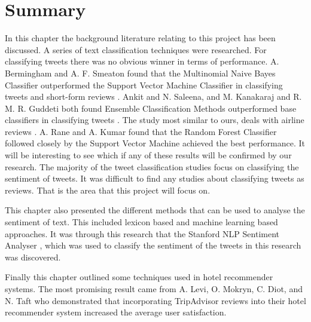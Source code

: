 
\section{Summary}


In this chapter the background literature relating to this project has been discussed. A series of text classification techniques were researched. For classifying tweets there was no obvious winner in terms of performance. A. Bermingham and A. F. Smeaton found that the Multinomial Naive Bayes Classifier outperformed the Support Vector Machine Classifier in classifying tweets and short-form reviews \cite{Berm2010}. Ankit and N. Saleena, and M. Kanakaraj and R. M. R. Guddeti both found Ensemble Classification Methods outperformed base classifiers in classifying tweets \cite{Ankit2018,Kanakaraj2015}. The study most similar to ours, deals with airline reviews \cite{Rane2018}. A. Rane and A. Kumar found that the Random Forest Classifier followed closely by the Support Vector Machine achieved the best performance. It will be interesting to see which if any of these results will be confirmed by our research. The majority of the tweet classification studies focus on classifying the sentiment of tweets. It was difficult to find any studies about classifying tweets as reviews. That is the area that this project will focus on. 

This chapter also presented the different methods that can be used to analyse the sentiment of text. This included lexicon based and machine learning based approaches. It was through this research that the Stanford NLP Sentiment Analyser \cite{stanfordSentiment2013}, which was used to classify the sentiment of the tweets in this research was discovered.

Finally this chapter outlined some techniques used in hotel recommender systems. The most promising result came from A. Levi, O. Mokryn, C. Diot, and N. Taft who demonstrated that incorporating TripAdvisor reviews into their hotel recommender system increased the average user satisfaction.







